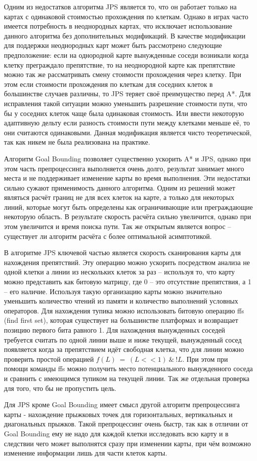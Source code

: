 Одним из недостатков алгоритма JPS является то, что он работает только на картах с одинаковой стоимостью прохождения по клеткам. Однако в играх часто имеется потребность в неоднородных картах, что исключает использование данного алгоритма без дополнительных модификаций. В качестве модификации для поддержки неоднородных карт может быть рассмотрено следующие предположение: если на однородной карте вынужденные соседи возникали когда клетку преграждало препятствие, то на неоднородной карте как препятствие можно так же рассматривать смену стоимости прохождения через клетку. При этом если стоимости прохождения по клеткам для соседних клеток в большинстве случаев различны, то JPS теряет своё преимущество перед A*. Для исправления такой ситуации можно уменьшить разрешение стоимости пути, что бы у соседних клеток чаще была одинаковая стоимость. Или ввести некоторую адаптивную дельту если разность стоимости пути между клетками меньше её, то они считаются одинаковыми. Данная модификация является чисто теоретической, так как никем не была реализована на практике.

Алгоритм Goal Bounding позволяет существенно ускорить A* и JPS, однако при этом часть препроцессинга выполняется очень долго, результат занимает много места и не поддерживает изменение карты во время выполнения. Эти недостатки сильно сужают применимость данного алгоритма. Одним из решений может являться расчёт границ не для всех клеток на карте, а только для некоторых линий, которые могут быть определены как ограничивающие или преграждающие некоторую область. В результате скорость расчёта сильно увеличится, однако при этом увеличится и время поиска пути. Так же открытым является вопрос -- существует ли алгоритм расчёта с более оптимальной асимптотикой.

В алгоритме JPS ключевой частью является скорость сканирования карты для нахождения препятствий. Эту операцию можно ускорить посредством анализа не одной клетки а линии из нескольких клеток за раз -- используя то, что карту можно представить как битовую матрицу, где 0 -- это отсутствие препятствия, а 1 -- его наличие. Используя такую организацию карты можно значительно уменьшить количество чтений из памяти и количество выполнений условных операторов. Для нахождения тупика можно использовать битовую операцию ffs (find first set), которая существует на большинстве платформах и возвращает позицию первого бита равного 1. Для нахождения вынужденных соседей требуется считать по одной линии выше и ниже текущей, вынужденный сосед появляется когда за препятствием идёт свободная клетка, что для линии можно проверить простой операцией $f(L)\ =\ (L<<1)\ \&\ !L$. При этом при помощи команды ffs можно получить место потенциального вынужденного соседа и сравнить с имеющимся тупиком на текущей линии. Так же отдельная проверка для того, что бы не пропустить цель.

Для JPS кроме Goal Bounding имеет смысл другой алгоритм препроцессинга карты - нахождение прыжковых точек для горизонтальных, вертикальных и диагональных прыжков. Такой препроцессинг очень быстр, так как в отличии от Goal Bounding ему не надо для каждой клетки исследовать всю карту и в следствии чего может выполнятся сразу при изменении карты, при чём возможно изменение информации лишь для части клеток карты.
